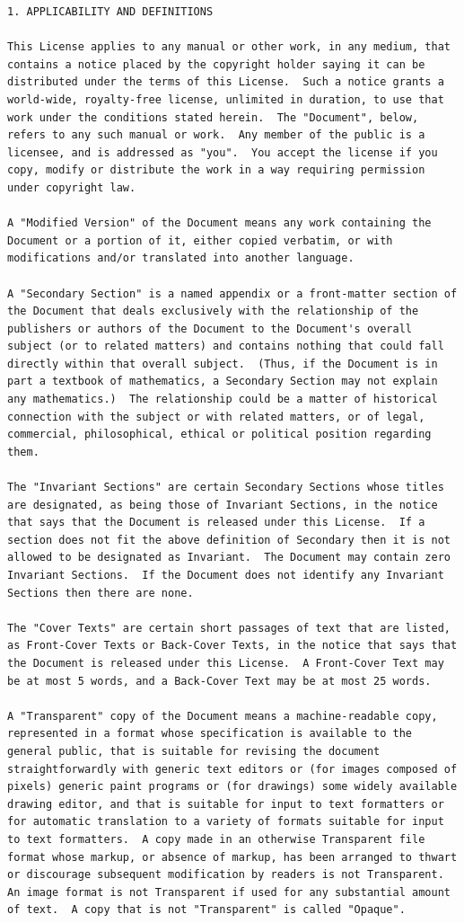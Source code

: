 \documentclass[a4paper]{report}
\begin{document}
\begin{verbatim}
1. APPLICABILITY AND DEFINITIONS

This License applies to any manual or other work, in any medium, that
contains a notice placed by the copyright holder saying it can be
distributed under the terms of this License.  Such a notice grants a
world-wide, royalty-free license, unlimited in duration, to use that
work under the conditions stated herein.  The "Document", below,
refers to any such manual or work.  Any member of the public is a
licensee, and is addressed as "you".  You accept the license if you
copy, modify or distribute the work in a way requiring permission
under copyright law.

A "Modified Version" of the Document means any work containing the
Document or a portion of it, either copied verbatim, or with
modifications and/or translated into another language.

A "Secondary Section" is a named appendix or a front-matter section of
the Document that deals exclusively with the relationship of the
publishers or authors of the Document to the Document's overall
subject (or to related matters) and contains nothing that could fall
directly within that overall subject.  (Thus, if the Document is in
part a textbook of mathematics, a Secondary Section may not explain
any mathematics.)  The relationship could be a matter of historical
connection with the subject or with related matters, or of legal,
commercial, philosophical, ethical or political position regarding
them.

The "Invariant Sections" are certain Secondary Sections whose titles
are designated, as being those of Invariant Sections, in the notice
that says that the Document is released under this License.  If a
section does not fit the above definition of Secondary then it is not
allowed to be designated as Invariant.  The Document may contain zero
Invariant Sections.  If the Document does not identify any Invariant
Sections then there are none.

The "Cover Texts" are certain short passages of text that are listed,
as Front-Cover Texts or Back-Cover Texts, in the notice that says that
the Document is released under this License.  A Front-Cover Text may
be at most 5 words, and a Back-Cover Text may be at most 25 words.

A "Transparent" copy of the Document means a machine-readable copy,
represented in a format whose specification is available to the
general public, that is suitable for revising the document
straightforwardly with generic text editors or (for images composed of
pixels) generic paint programs or (for drawings) some widely available
drawing editor, and that is suitable for input to text formatters or
for automatic translation to a variety of formats suitable for input
to text formatters.  A copy made in an otherwise Transparent file
format whose markup, or absence of markup, has been arranged to thwart
or discourage subsequent modification by readers is not Transparent.
An image format is not Transparent if used for any substantial amount
of text.  A copy that is not "Transparent" is called "Opaque".


\end{verbatim}
\end{document}

